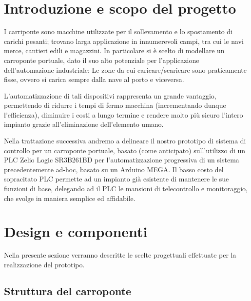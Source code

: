 \section{Introduzione e scopo del progetto}

I carriponte sono macchine utilizzate per il sollevamento e lo spostamento di carichi pesanti;
trovano larga applicazione in innumerevoli campi, tra cui le navi merce, cantieri edili e magazzini.
In particolare si è scelto di modellare un carroponte portuale, dato il suo alto potenziale per
l'applicazione dell'automazione industriale: Le zone da cui caricare/scaricare sono praticamente
fisse, ovvero si carica sempre dalla nave al porto e viceversa.
\cite{ren2021design,li2015data}

L'automatizzazione di tali dispositivi rappresenta un grande vantaggio, permettendo di ridurre i
tempi di fermo macchina (incrementando dunque l'efficienza), diminuire i costi a lungo termine e
rendere molto più sicuro l'intero impianto grazie all'eliminazione dell'elemento umano.
\cite{gupta2004simplified}

Nella trattazione successiva andremo a delineare il nostro prototipo di sistema di controllo per un
carroponte portuale, basato (come anticipato) sull'utilizzo di un PLC Zelio Logic SR3B261BD per
l'automatizzazione progressiva di un sistema precedentemente ad-hoc, basato su un Arduino MEGA. Il
basso costo del sopracitato PLC permette ad un impianto già esistente di mantenere le sue funzioni
di base, delegando ad il PLC le mansioni di telecontrollo e monitoraggio, che svolge in maniera
semplice ed affidabile.

\section{Design e componenti}

Nella presente sezione verranno descritte le scelte progettuali effettuate per la realizzazione del
prototipo.

\subsection{Struttura del carroponte}

